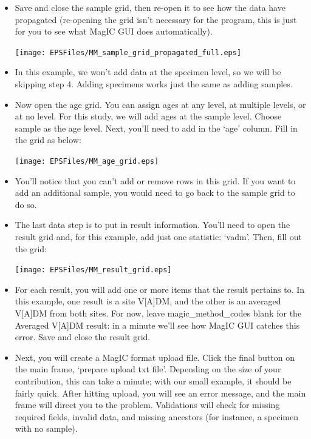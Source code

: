 \documentclass[11pt]{book}
\begin{document}
{{\begin{itemize}
    \texttt{[image: EPSFiles/MM\_sample\_grid\_added\_cols.eps]}

  \item Save and close the sample grid, then re-open it to see how the data have propagated (re-opening the grid isn't necessary for the program, this is just for you to see what MagIC GUI does automatically).

    \texttt{[image: EPSFiles/MM\_sample\_grid\_propagated\_full.eps]}

  \item In this example, we won't add data at the specimen level, so we will be skipping step 4.  Adding specimens works just the same as adding samples.

  \item Now open the age grid.  You can assign ages at any level, at multiple levels, or at no level.  For this study, we will add ages at the sample level.  Choose sample as the age level.  Next, you'll need to add in the `age' column.  Fill in the grid as below:

    \texttt{[image: EPSFiles/MM\_age\_grid.eps]}

  \item You'll notice that you can't add or remove rows in this grid.  If you want to add an additional sample, you would need to go back to the sample grid to do so.

  \item The last data step is to put in result information.  You'll need to open the result grid and, for this example, add just one statistic: `vadm'.  Then, fill out the grid:

    \texttt{[image: EPSFiles/MM\_result\_grid.eps]}

  \item For each result, you will add one or more items that the result pertains to.  In this example, one result is a site V[A]DM, and the other is an averaged V[A]DM from both sites.  For now, leave magic\_method\_codes blank for the Averaged V[A]DM result: in a minute we'll see how MagIC GUI catches this error.  Save and close the result grid.

  \item Next, you will create a MagIC format upload file.  Click the final button on the main frame, `prepare upload txt file'.  Depending on the size of your contribution, this can take a minute; with our small example, it should be fairly quick.  After hitting upload, you will see an error message, and the main frame will direct you to the problem.  Validations will check for missing required fields, invalid data, and missing ancestors (for instance, a specimen with no sample).


\end{itemize}}}
\end{document}
